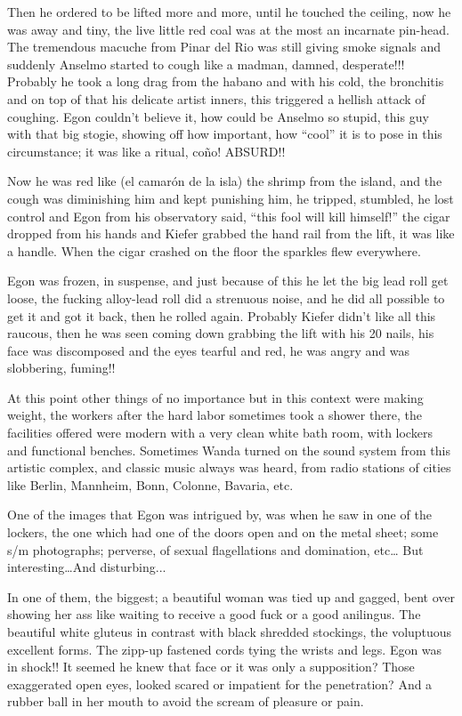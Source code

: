 \documentclass[smalldemyvopaper,11pt,twoside,onecolumn,openright,extrafontsizes]{memoir}
\newlength\drop
\begin{document}
Then he ordered to be lifted more and more, until he touched the ceiling, now he was away and tiny, the live little red coal was at the most an incarnate pin-head. The tremendous macuche from Pinar del Rio was still giving smoke signals and suddenly Anselmo started to cough like a madman, damned, desperate!!! Probably he took a long drag from the habano and with his cold, the bronchitis and on top of that his delicate artist inners, this triggered a hellish attack of coughing. Egon couldn’t believe it, how could be Anselmo so stupid, this guy with that big stogie, showing off how important, how “cool” it is to pose in this circumstance; it was like a ritual, coño! ABSURD!!

Now he was red like (el camarón de la isla) the shrimp from the island, and the cough was diminishing him and kept punishing him, he tripped, stumbled, he lost control and Egon from his observatory said, “this fool will kill himself!” the cigar dropped from his hands and Kiefer grabbed the hand rail from the lift, it was like a handle. When the cigar crashed on the floor the sparkles flew everywhere. 

Egon was frozen, in suspense, and just because of this he let the big lead roll get loose, the fucking alloy-lead roll did a strenuous noise, and he did all possible to get it and got it back, then he rolled again. Probably Kiefer didn’t like all this raucous, then he was seen coming down grabbing the lift with his 20 nails, his face was discomposed and the eyes tearful and red, he was angry and was slobbering, fuming!!

At this point other things of no importance but in this context were making weight, the workers after the hard labor sometimes took a shower there, the facilities offered were modern with a very clean white bath room, with lockers and functional benches. Sometimes Wanda turned on the sound system from this artistic complex, and classic music always was heard, from radio stations of cities like Berlin, Mannheim, Bonn, Colonne, Bavaria, etc.

One of the images that Egon was intrigued by, was when he saw in one of the lockers, the one which had one of the doors open and on the metal sheet; some s/m photographs; perverse, of sexual flagellations and domination, etc… But interesting…And disturbing...

In one of them, the biggest; a beautiful woman was tied up and gagged, bent over showing her ass like waiting to receive a good fuck or a good anilingus. The beautiful white gluteus in contrast with black shredded stockings, the voluptuous excellent forms. The zipp-up fastened cords tying the wrists and legs. Egon was in shock!! It seemed he knew that face or it was only a supposition? Those exaggerated open eyes,  looked scared or impatient for the penetration? And a rubber ball in her mouth to avoid the scream of pleasure or pain.
\end{document}
